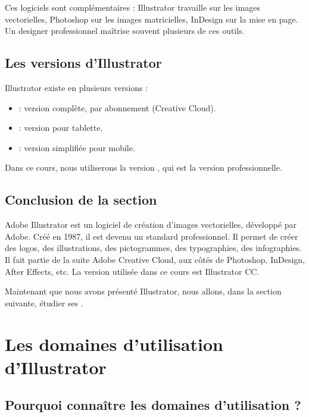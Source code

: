 Ces logiciels sont complémentaires : Illustrator travaille sur les images vectorielles, Photoshop sur les images matricielles, InDesign sur la mise en page. Un designer professionnel maîtrise souvent plusieurs de ces outils.

\subsection{Les versions d'Illustrator}

Illustrator existe en plusieurs versions :

\begin{itemize}
    \item {} : version complète, par abonnement (Creative Cloud).
    \item {} : version pour tablette.
    \item {} : version simplifiée pour mobile.
\end{itemize}

Dans ce cours, nous utiliserons la version , qui est la version professionnelle.

\subsection*{Conclusion de la section}

Adobe Illustrator est un logiciel de création d'images vectorielles, développé par Adobe. Créé en 1987, il est devenu un standard professionnel. Il permet de créer des logos, des illustrations, des pictogrammes, des typographies, des infographies. Il fait partie de la suite Adobe Creative Cloud, aux côtés de Photoshop, InDesign, After Effects, etc. La version utilisée dans ce cours est Illustrator CC.

Maintenant que nous avons présenté Illustrator, nous allons, dans la section suivante, étudier ses .

\section{Les domaines d'utilisation d'Illustrator}

\subsection{Pourquoi connaître les domaines d'utilisation ?}

